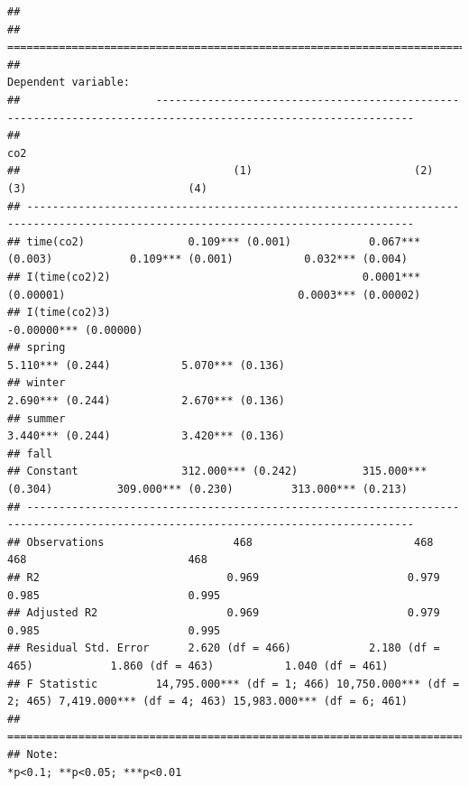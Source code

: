 \documentclass[AER]{AEA}
\begin{document}
\begin{verbatim}
## 
## ==================================================================================================================================
##                                                                  Dependent variable:                                              
##                     --------------------------------------------------------------------------------------------------------------
##                                                                          co2                                                      
##                                 (1)                         (2)                        (3)                         (4)            
## ----------------------------------------------------------------------------------------------------------------------------------
## time(co2)                0.109*** (0.001)            0.067*** (0.003)            0.109*** (0.001)           0.032*** (0.004)      
## I(time(co2)2)                                       0.0001*** (0.00001)                                    0.0003*** (0.00002)    
## I(time(co2)3)                                                                                             -0.00000*** (0.00000)   
## spring                                                                           5.110*** (0.244)           5.070*** (0.136)      
## winter                                                                           2.690*** (0.244)           2.670*** (0.136)      
## summer                                                                           3.440*** (0.244)           3.420*** (0.136)      
## fall                                                                                                                              
## Constant                312.000*** (0.242)          315.000*** (0.304)          309.000*** (0.230)         313.000*** (0.213)     
## ----------------------------------------------------------------------------------------------------------------------------------
## Observations                    468                         468                        468                         468            
## R2                             0.969                       0.979                      0.985                       0.995           
## Adjusted R2                    0.969                       0.979                      0.985                       0.995           
## Residual Std. Error      2.620 (df = 466)            2.180 (df = 465)            1.860 (df = 463)           1.040 (df = 461)      
## F Statistic         14,795.000*** (df = 1; 466) 10,750.000*** (df = 2; 465) 7,419.000*** (df = 4; 463) 15,983.000*** (df = 6; 461)
## ==================================================================================================================================
## Note:                                                                                                  *p<0.1; **p<0.05; ***p<0.01
\end{verbatim}
\end{document}
